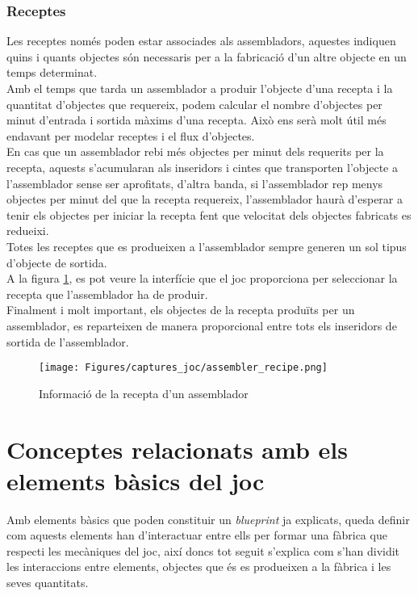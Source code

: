 \subsubsection{Receptes} \label{subsec:recipes}
Les receptes només poden estar associades als assembladors, aquestes indiquen quins i quants objectes són necessaris per a la fabricació d'un altre objecte en un temps determinat.\\
Amb el temps que tarda un assemblador a produir l'objecte d'una recepta i la quantitat d'objectes que requereix, podem calcular el nombre d'objectes per minut d'entrada i sortida màxims d'una recepta. Això ens serà molt útil més endavant per modelar receptes i el flux d'objectes.\\
En cas que un assemblador rebi més objectes per minut dels requerits per la recepta, aquests s'acumularan als inseridors i cintes que transporten l'objecte a l'assemblador sense ser aprofitats, d'altra banda, si l'assemblador rep menys objectes per minut del que la recepta requereix, l'assemblador haurà d'esperar a tenir els objectes per iniciar la recepta fent que velocitat dels objectes fabricats es redueixi.\\
Totes les receptes que es produeixen a l'assemblador sempre generen un sol tipus d'objecte de sortida.\\
A la figura \ref{fig:assembler_recipe}, es pot veure la interfície que el joc proporciona per seleccionar la recepta que l'assemblador ha de produir.\\
Finalment i molt important, els objectes de la recepta produïts per un assemblador, es reparteixen de manera proporcional entre tots els inseridors de sortida de l'assemblador.

\begin{figure}[H]
    \centering
    \texttt{[image: Figures/captures\_joc/assembler\_recipe.png]}
    \caption{Informació de la recepta d'un assemblador}
    \label{fig:assembler_recipe}
\end{figure}

\section{Conceptes relacionats amb els elements bàsics del joc}
Amb elements bàsics que poden constituir un \textit{blueprint} ja explicats, queda definir com aquests elements han d'interactuar entre ells per formar una fàbrica que respecti les mecàniques del joc, així doncs tot seguit s'explica com s'han dividit les interaccions entre elements, objectes que és es produeixen a la fàbrica i les seves quantitats.

